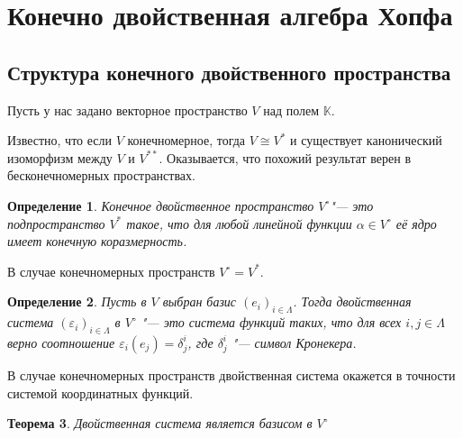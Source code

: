 \documentclass[12pt, reqno, a4paper, oneside, notitlepage]{amsart}
\theoremstyle{mytheoremstyle}
\newtheorem{theorem}{Теорема}[section]
\theoremstyle{myremarkstyle}
\newtheorem{definition}[theorem]{Определение}
\numberwithin{equation}{section}
\begin{document}
\section{Конечно двойственная алгебра Хопфа}

\subsection{Структура конечного двойственного пространства}

Пусть у нас задано векторное пространство $V$ над полем $\mathbb{K}$. 

Известно, что если $V$ конечномерное, тогда $V \cong V^*$ и существует канонический изоморфизм между $V$ и $V^{**}$. Оказывается, что похожий результат верен в бесконечномерных пространствах. 

\begin{definition} 
Конечное двойственное пространство $V^\circ$"--- это подпространство $V^*$ такое, что для любой линейной функции $\alpha \in V^\circ$ её ядро имеет конечную коразмерность.
\end{definition}

В случае конечномерных пространств $V^\circ = V^*$.

\begin{definition}
    Пусть в $V$ выбран базис $(e_i)_{i \in \Lambda}$. Тогда 
    двойственная система $(\varepsilon_i)_{i \in \Lambda}$ в $V^\circ$ "--- это система функций  таких, что для всех $i, j \in \Lambda$ верно соотношение $\varepsilon_i(e_j) = \delta^i_j$, где $\delta^i_j$ "--- символ Кронекера.
\end{definition}

В случае конечномерных пространств двойственная система окажется в точности системой координатных функций. 

\begin{theorem}
    Двойственная система является базисом в $V^\circ$
\end{theorem}
\end{document}
